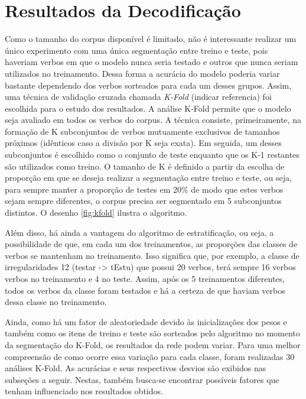 \section{Resultados da Decodificação}
\label{sec:results}
Como o tamanho do corpus disponível é limitado, não é interessante realizar um único experimento com uma única segmentação entre treino e teste, pois haveriam verbos em que o modelo nunca seria testado e outros que nunca seriam utilizados no treinamento. Dessa forma a acurácia do modelo poderia variar bastante dependendo dos verbos sorteados para cada um desses grupos. Assim, uma técnica de validação cruzada chamada \textit{K-Fold} (indicar referencia) foi escolhida para o estudo dos resultados. A análise K-Fold permite que o modelo seja avaliado em todos os verbos do corpus. A técnica consiste, primeiramente, na formação de K subconjuntos de verbos mutuamente exclusivos de tamanhos próximos (idênticos caso a divisão por K seja exata). Em seguida, um desses subconjuntos é escolhido como o conjunto de teste enquanto que os K-1 restantes são utilizados como treino. O tamanho de K é definido a partir da escolha de proporção em que se deseja realizar a segmentação entre treino e teste, ou seja, para sempre manter a proporção de testes em 20\% de modo que estes verbos sejam sempre diferentes, o corpus precisa ser segmentado em 5 subconjuntos distintos. O desenho \ref{fig:kfold} ilustra o algoritmo. 



Além disso, há ainda a vantagem do algoritmo de estratificação, ou seja, a possibilidade de que, em cada um dos treinamentos, as proporções das classes de verbos se mantenham no treinamento. Isso significa que, por exemplo, a classe de irregularidades 12 (testar -> tEstu) que possui 20 verbos, terá sempre 16 verbos verbos no treinamento e 4 no teste. Assim, após os 5 treinamentos diferentes, todos os verbos da classe foram testados e há a certeza de que haviam verbos dessa classe no treinamento. 

Ainda, como há um fator de aleatoriedade devido às inicializações dos pesos e também como os itens de treino e teste são sorteados pelo algoritmo no momento da segmentação do K-Fold, os resultados da rede podem variar. Para uma melhor compreensão de como ocorre essa variação para cada classe, foram realizadas 30 análises K-Fold. As acurácias e seus respectivos desvios são exibidos nas subseções a seguir. Nestas, também busca-se encontrar possíveis fatores que tenham influenciado nos resultados obtidos.

